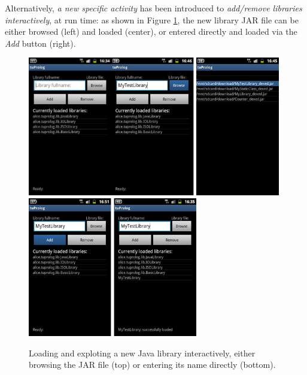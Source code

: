 Alternatively, \textit{a new specific activity} has been introduced to \textit{add/remove libraries interactively}, at run time: 
as shown in Figure \ref{fig:android10}, the new library JAR file can be either browsed (left) and loaded (center), or entered directly and loaded via the \textit{Add} button (right).
%
\begin{figure}
\centering
  \includegraphics[height=230px]{images/android9b.png}\includegraphics[height=230px]{images/android10.png}
  \includegraphics[height=230px]{images/android11.png}
  \caption{Loading and exploting a new Java library interactively, either browsing the JAR file (top) or entering its name directly (bottom).}\label{fig:android10}
\end{figure}

